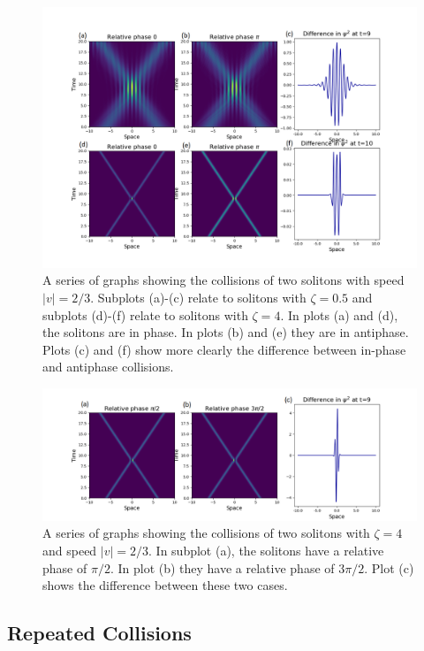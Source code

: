 \documentclass[10pt, twocolumn]{revtex4}    %
\begin{document}
\begin{figure}[h!]
\includegraphics[width=\textwidth]{extensionpic.png}
\caption{A series of graphs showing the collisions of two solitons with speed $|v|=2/3$. Subplots (a)-(c) relate to solitons with $\zeta=0.5$ and subplots (d)-(f) relate to solitons with $\zeta=4$. In plots (a) and (d), the solitons are in phase. In plots (b) and (e) they are in antiphase. Plots (c) and (f) show more clearly the difference between in-phase and antiphase collisions.}
\label{collision}
\end{figure}

\begin{figure}[h]
\includegraphics[width=\textwidth]{asymmetrical_collision.png}
\caption{A series of graphs showing the collisions of two solitons with $\zeta=4$ and speed $|v|=2/3$. In subplot (a), the solitons have a relative phase of $\pi/2$. In plot (b) they have a relative phase of $3\pi/2$. Plot (c) shows the difference between these two cases.}
\label{asymmetric}
\end{figure}

\subsection{Repeated Collisions}
\end{document}
